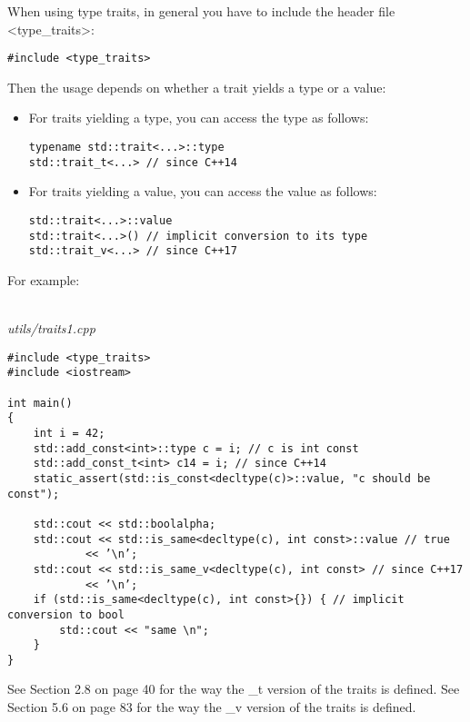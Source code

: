 
When using type traits, in general you have to include the header file <type\_traits>:

\begin{lstlisting}[style=styleCXX]
#include <type_traits>
\end{lstlisting}

Then the usage depends on whether a trait yields a type or a value:

\begin{itemize}
\item 
For traits yielding a type, you can access the type as follows:
\begin{lstlisting}[style=styleCXX]
typename std::trait<...>::type
std::trait_t<...> // since C++14
\end{lstlisting}

\item 
For traits yielding a value, you can access the value as follows:
\begin{lstlisting}[style=styleCXX]
std::trait<...>::value
std::trait<...>() // implicit conversion to its type
std::trait_v<...> // since C++17
\end{lstlisting}
\end{itemize}

For example:

\hspace*{\fill} \\ %
\noindent
\textit{utils/traits1.cpp}
\begin{lstlisting}[style=styleCXX]
#include <type_traits>
#include <iostream>

int main()
{
	int i = 42;
	std::add_const<int>::type c = i; // c is int const
	std::add_const_t<int> c14 = i; // since C++14
	static_assert(std::is_const<decltype(c)>::value, "c should be const");
	
	std::cout << std::boolalpha;
	std::cout << std::is_same<decltype(c), int const>::value // true
			<< ’\n’;
	std::cout << std::is_same_v<decltype(c), int const> // since C++17
			<< ’\n’;
	if (std::is_same<decltype(c), int const>{}) { // implicit conversion to bool
		std::cout << "same \n";
	}
}
\end{lstlisting}

See Section 2.8 on page 40 for the way the \_t version of the traits is defined. See Section 5.6 on page 83 for the way the \_v version of the traits is defined.


